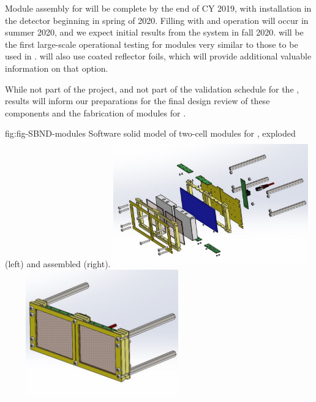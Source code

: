 Module assembly for  will be complete by the end of CY 2019, 
with installation in the detector beginning in spring of 2020.  
Filling with  and operation will occur in summer 2020, and we expect initial results from the  system in fall 2020.   will be the first large-scale operational testing for  modules very similar to those to be used in .
 will also use coated reflector foils, which will provide additional valuable information on that   option.  

While not part of the  project, and not part of the validation schedule for the ,  results will inform our preparations for the final design review of these components and the fabrication of modules for .  

\begin{dunefigure}
 {fig:fig-SBND-modules}
 {Software solid model of two-cell  modules for , exploded (left) and assembled (right).}
\includegraphics[angle=0,width=8.4cm,height=5.5cm]{graphics/pds-sbnd-xarapu-exploded.pdf}
\includegraphics[angle=0,width=8.4cm,height=5.5cm]{graphics/pds-sbnd-xarapu-assembled.pdf}
\end{dunefigure}

\subsubsection{}
\label{sec:valid-pdune2}

